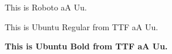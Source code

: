 \documentclass{article}
\begin{document}
This is Roboto aA Uu.  

{\ubuntu This is Ubuntu Regular from  TTF aA Uu.}  


\textbf{\ubuntu This is Ubuntu Bold from TTF aA Uu.} 

 
\end{document}
